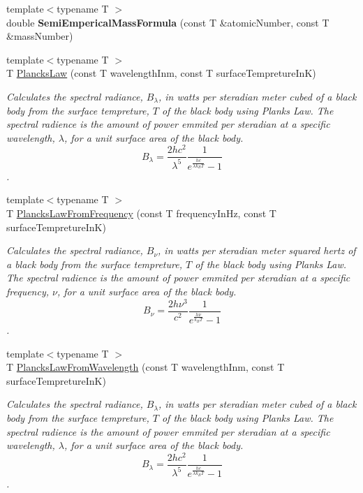 \begin{DoxyCompactItemize}
{\footnotesize template$<$typename T $>$ }\\double {\bfseries Semi\+Emperical\+Mass\+Formula} (const T \&atomic\+Number, const T \&mass\+Number)
\item 
{\footnotesize template$<$typename T $>$ }\\T \mbox{\hyperlink{group___e_g_x_phys-_electrodynamics-_black_body-_plancks_law_ga44d8dc3e072ffc7d860cd8f07463f091}{Plancks\+Law}} (const T wavelength\+Inm, const T surface\+Tempreture\+InK)
\begin{DoxyCompactList}\small\item\em Calculates the spectral radiance, $B_{\lambda}$, in watts per steradian meter cubed of a black body from the surface tempreture, $T$ of the black body using Plank\textquotesingle{}s Law. The spectral radience is the amount of power emmited per steradian at a specific wavelength, $\lambda$, for a unit surface area of the black body. \[ B_{\lambda} = \dfrac{2 h c^2}{\lambda^5} \dfrac{1}{e^{\frac{hc}{\lambda k_B T}} - 1} \]. \end{DoxyCompactList}\item 
{\footnotesize template$<$typename T $>$ }\\T \mbox{\hyperlink{group___e_g_x_phys-_electrodynamics-_black_body-_plancks_law_ga68aae82f8a086831358c4a61c8c80ba4}{Plancks\+Law\+From\+Frequency}} (const T frequency\+In\+Hz, const T surface\+Tempreture\+InK)
\begin{DoxyCompactList}\small\item\em Calculates the spectral radiance, $B_{\nu}$, in watts per steradian meter squared hertz of a black body from the surface tempreture, $T$ of the black body using Plank\textquotesingle{}s Law. The spectral radience is the amount of power emmited per steradian at a specific frequency, $\nu$, for a unit surface area of the black body. \[ B_{\nu} = \dfrac{2 h \nu^3}{c^2} \dfrac{1}{e^{\frac{h\nu}{k_B T}} - 1} \]. \end{DoxyCompactList}\item 
{\footnotesize template$<$typename T $>$ }\\T \mbox{\hyperlink{group___e_g_x_phys-_electrodynamics-_black_body-_plancks_law_ga54639bc031ded51ef78aa82b0457a4dd}{Plancks\+Law\+From\+Wavelength}} (const T wavelength\+Inm, const T surface\+Tempreture\+InK)
\begin{DoxyCompactList}\small\item\em Calculates the spectral radiance, $B_{\lambda}$, in watts per steradian meter cubed of a black body from the surface tempreture, $T$ of the black body using Plank\textquotesingle{}s Law. The spectral radience is the amount of power emmited per steradian at a specific wavelength, $\lambda$, for a unit surface area of the black body. \[ B_{\lambda} = \dfrac{2 h c^2}{\lambda^5} \dfrac{1}{e^{\frac{hc}{\lambda k_B T}} - 1} \]. \end{DoxyCompactList}\item 

\end{DoxyCompactItemize}
